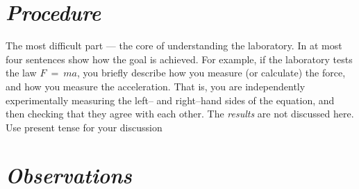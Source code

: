 \documentclass[epsfig,12pt]{article}
\begin{document}
\section*{\textit{Procedure}}

	The most difficult part --- the core of understanding the laboratory.
	In at most four sentences show how the goal is achieved.
	For example, if the laboratory tests the law $ F ~=~ m a $,
	you briefly describe how you measure (or calculate) the force,
	and how you measure the acceleration.
	That is, you are independently experimentally measuring the left-- and right--hand sides 
	of the equation, and then checking that they agree with each other.
	The \emph{results} are not discussed here.
	Use present tense for your discussion
	

\section*{\textit{Observations}}
\end{document}
